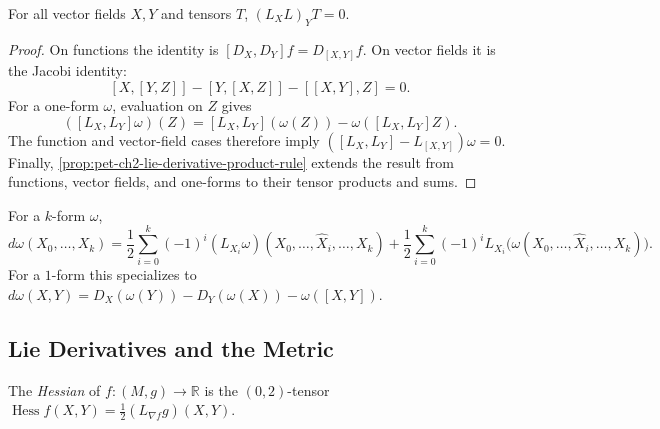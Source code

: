 \begin{proposition}
  \label{prop:pet-ch2-generalized-jacobi-identity}
  \leanok
  For all vector fields $X,Y$ and tensors $T$, $(L_XL)_YT=0$.
\end{proposition}
\begin{proof}
  \leanok
  \sketch
  On functions the identity is
  $[D_X,D_Y]f=D_{[X,Y]}f$. On vector fields it is the Jacobi identity:
  \[
    [X,[Y,Z]]-[Y,[X,Z]]-[[X,Y],Z]=0.
  \]
  For a one-form $\omega$, evaluation on $Z$ gives
  \[
    ([L_X,L_Y]\omega)(Z)
      =[L_X,L_Y](\omega(Z))-\omega([L_X,L_Y]Z).
  \]
  The function and vector-field cases therefore imply
  $([L_X,L_Y]-L_{[X,Y]})\omega=0$. Finally,
  \cref{prop:pet-ch2-lie-derivative-product-rule} extends the result from
  functions, vector fields, and one-forms to their tensor products and sums.
\end{proof}

\begin{definition}
  \label{def:pet-ch2-exterior-derivative-lie-formula}
  \leanok
  For a $k$-form $\omega$,
  \[
    d\omega(X_0,\dots,X_k)
    =\frac12\sum_{i=0}^k(-1)^i(L_{X_i}\omega)(X_0,\dots,\hat X_i,\dots,X_k)
    +\frac12\sum_{i=0}^k(-1)^iL_{X_i}\big(\omega(X_0,\dots,\hat X_i,\dots,X_k)\big).
  \]
  For a $1$-form this specializes to
  $d\omega(X,Y)=D_X(\omega(Y))-D_Y(\omega(X))-\omega([X,Y])$.
\end{definition}

\subsection{Lie Derivatives and the Metric}

\begin{definition}
  \label{def:pet-ch2-hessian-lie-derivative}
  \leanok
  The \emph{Hessian} of $f:(M,g)\to\mathbb{R}$ is the $(0,2)$-tensor
  $\operatorname{Hess}f(X,Y)=\frac12(L_{\nabla f}g)(X,Y)$.
\end{definition}

